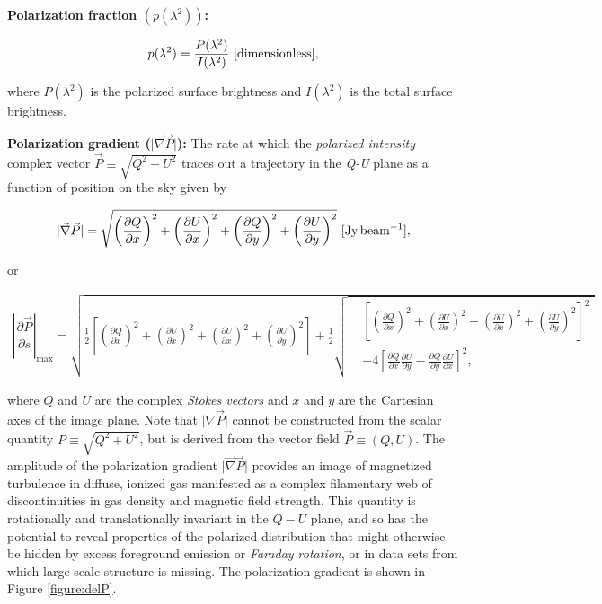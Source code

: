 \documentclass[a4paper,10pt]{article}
\begin{document}
{\noindent}\textbf{Polarization fraction $(p(\lambda^2))$:}

\begin{align*}
    p(\lambda^2) = \frac{P(\lambda^2)}{I(\lambda^2)} ~ [{\rm dimensionless}],
\end{align*}

{\noindent}where $P(\lambda^2)$ is the polarized surface brightness and $I(\lambda^2)$ is the total surface brightness.

{\noindent}\textbf{Polarization gradient ($\lvert\vec{\nabla}\vec{P}\rvert$):} The rate at which the \textit{polarized intensity} complex vector $\vec{P}\equiv\sqrt{Q^2+U^2}$ traces out a trajectory in the \textit{Q-U} plane as a function of position on the sky given by

\begin{align*}
    \lvert\vec\nabla\vec{P}\rvert = \sqrt{\left(\frac{\partial Q}{\partial x}\right)^2 + \left(\frac{\partial U}{\partial x}\right)^2 + \left(\frac{\partial Q}{\partial y}\right)^2 + \left(\frac{\partial U}{\partial y}\right)^2} ~ [{\rm Jy\,beam^{-1}}],
\end{align*}

{\noindent}or

\begin{equation*}
\begin{split}
\left\lvert\dfrac{\partial\vec{P}}{\partial s}\right\rvert_\mathrm{max} = \sqrt{ \frac{1}{2}\left[ \left(\frac{\partial Q}{\partial x}\right)^2 + \left(\frac{\partial U}{\partial x}\right)^2 + \left(\frac{\partial U}{\partial x}\right)^2 + \left(\frac{\partial U}{\partial y}\right)^2 \right] + \frac{1}{2} 
  \sqrt{
    \begin{aligned}
    & \left[ \left(\frac{\partial Q}{\partial x}\right)^2 + \left(\frac{\partial U}{\partial x}\right)^2 + \left(\frac{\partial U}{\partial x}\right)^2 + \left(\frac{\partial U}{\partial y}\right)^2 \right]^2 \\
    &- 4\left[ \frac{\partial Q}{\partial x}\frac{\partial U}{\partial y} - \frac{\partial Q}{\partial y}\frac{\partial U}{\partial x}  \right]^2,
    \end{aligned}
    }}
\end{split}
\end{equation*}

{\noindent}where $Q$ and $U$ are the complex \textit{Stokes vectors} and $x$ and $y$ are the Cartesian axes of the image plane. Note that $\lvert\nabla\vec{P}\rvert$ cannot be constructed from the scalar quantity $P\equiv\sqrt{Q^2+U^2}$, but is derived from the vector field $\vec{P}\equiv(Q,U)$. The amplitude of the polarization gradient $\lvert\vec\nabla\vec{P}\rvert$ provides an image of magnetized turbulence in diffuse, ionized gas manifested as a complex filamentary web of discontinuities in gas density and magnetic field strength. This quantity is rotationally and translationally invariant in the $Q-U$ plane, and so has the potential to reveal properties of the polarized distribution that might otherwise be hidden by excess foreground emission or \textit{Faraday rotation}, or in data sets from which large-scale structure is missing. The polarization gradient is shown in Figure \ref{figure:delP}.
\end{document}

